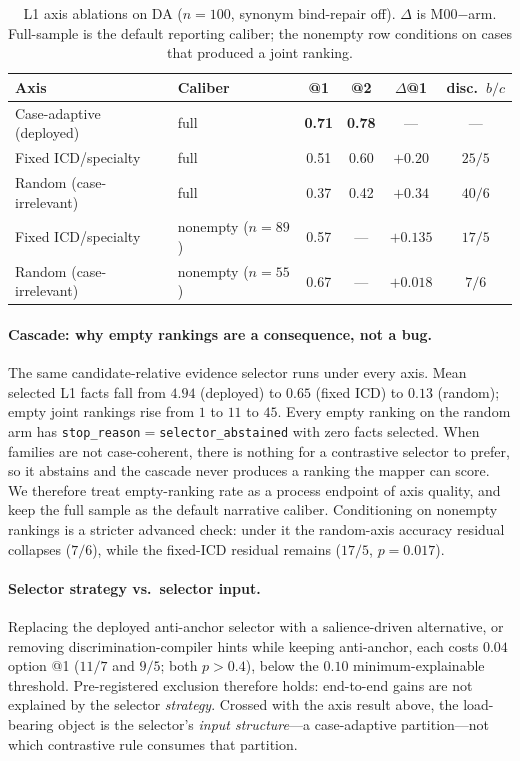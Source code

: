 \begin{table}[t]
\centering
\small
\caption{L1 axis ablations on DA ($n{=}100$, synonym bind-repair off). $\Delta$ is M00${-}$arm. Full-sample is the default reporting caliber; the nonempty row conditions on cases that produced a joint ranking.}
\label{tab:org-axis}
\begin{tabular}{llcccc}
\toprule
Axis & Caliber & @1 & @2 & $\Delta$@1 & disc.\ $b/c$ \\
\midrule
Case-adaptive (deployed) & full & \textbf{0.71} & \textbf{0.78} & --- & --- \\
Fixed ICD/specialty & full & 0.51 & 0.60 & $+0.20$ & $25/5$ \\
Random (case-irrelevant) & full & 0.37 & 0.42 & $+0.34$ & $40/6$ \\
\midrule
Fixed ICD/specialty & nonempty ($n{=}89$) & 0.57 & --- & $+0.135$ & $17/5$ \\
Random (case-irrelevant) & nonempty ($n{=}55$) & 0.67 & --- & $+0.018$ & $7/6$ \\
\bottomrule
\end{tabular}
\end{table}

\paragraph{Cascade: why empty rankings are a consequence, not a bug.}
The same candidate-relative evidence selector runs under every axis.
Mean selected L1 facts fall from $4.94$ (deployed) to $0.65$ (fixed ICD) to $0.13$ (random); empty joint rankings rise from $1$ to $11$ to $45$.
Every empty ranking on the random arm has \texttt{stop\_reason}${=}$\texttt{selector\_abstained} with zero facts selected.
When families are not case-coherent, there is nothing for a contrastive selector to prefer, so it abstains and the cascade never produces a ranking the mapper can score.
We therefore treat empty-ranking rate as a process endpoint of axis quality, and keep the full sample as the default narrative caliber.
Conditioning on nonempty rankings is a stricter advanced check: under it the random-axis accuracy residual collapses ($7/6$), while the fixed-ICD residual remains ($17/5$, $p{=}0.017$).

\paragraph{Selector strategy vs.\ selector input.}
Replacing the deployed anti-anchor selector with a salience-driven alternative, or removing discrimination-compiler hints while keeping anti-anchor, each costs $0.04$ option @1 ($11/7$ and $9/5$; both $p{>}0.4$), below the $0.10$ minimum-explainable threshold.
Pre-registered exclusion therefore holds: end-to-end gains are not explained by the selector \emph{strategy}.
Crossed with the axis result above, the load-bearing object is the selector's \emph{input structure}---a case-adaptive partition---not which contrastive rule consumes that partition.

